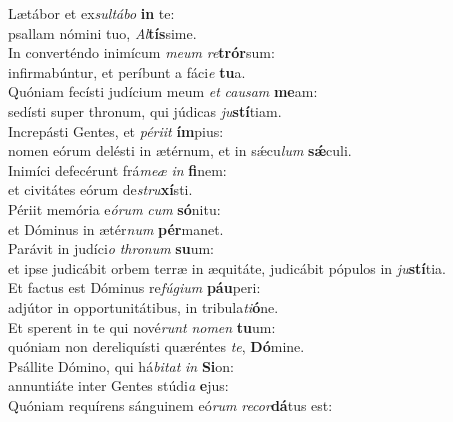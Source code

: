 \evenverse Lætábor et ex\textit{sul}\textit{tá}\textit{bo} \textbf{in} te:~\*\\
\evenverse psallam nómini tuo, \textit{Al}\textbf{tís}sime.\\
\oddverse In converténdo inimícum \textit{me}\textit{um} \textit{re}\textbf{trór}sum:~\*\\
\oddverse infirmabúntur, et períbunt a fáci\textit{e} \textbf{tu}a.\\
\evenverse Quóniam fecísti judícium meum \textit{et} \textit{cau}\textit{sam} \textbf{me}am:~\*\\
\evenverse sedísti super thronum, qui júdicas \textit{ju}\textbf{stí}tiam.\\
\oddverse Increpásti Gentes, et \textit{pé}\textit{ri}\textit{it} \textbf{ím}pius:~\*\\
\oddverse nomen eórum delésti in ætérnum, et in sǽcu\textit{lum} \textbf{sǽ}culi.\\
\evenverse Inimíci defecérunt frá\textit{me}\textit{æ} \textit{in} \textbf{fi}nem:~\*\\
\evenverse et civitátes eórum de\textit{stru}\textbf{xí}sti.\\
\oddverse Périit memória e\textit{ó}\textit{rum} \textit{cum} \textbf{só}nitu:~\*\\
\oddverse et Dóminus in ætér\textit{num} \textbf{pér}manet.\\
\evenverse Parávit in judíci\textit{o} \textit{thro}\textit{num} \textbf{su}um:~\*\\
\evenverse et ipse judicábit orbem terræ in æquitáte, judicábit pópulos in \textit{ju}\textbf{stí}tia.\\
\oddverse Et factus est Dóminus re\textit{fú}\textit{gi}\textit{um} \textbf{páu}peri:~\*\\
\oddverse adjútor in opportunitátibus, in tribula\textit{ti}\textbf{ó}ne.\\
\evenverse Et sperent in te qui nové\textit{runt} \textit{no}\textit{men} \textbf{tu}um:~\*\\
\evenverse quóniam non dereliquísti quæréntes \textit{te}, \textbf{Dó}mine.\\
\oddverse Psállite Dómino, qui há\textit{bi}\textit{tat} \textit{in} \textbf{Si}on:~\*\\
\oddverse annuntiáte inter Gentes stúdi\textit{a} \textbf{e}jus:\\
\evenverse Quóniam requírens sánguinem eó\textit{rum} \textit{re}\textit{cor}\textbf{dá}tus est:~\*\\
